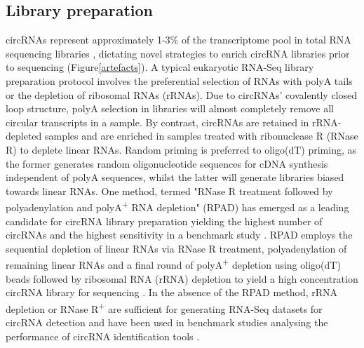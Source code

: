 \documentclass[journal,review,submit,pdftex,moreauthors]{Definitions/mdpi}
\begin{document}
\subsection{Library preparation}
circRNAs represent approximately 1-3\% of the transcriptome pool in total RNA sequencing libraries \cite{Guria2022May}, dictating novel strategies to enrich circRNA libraries prior to sequencing (Figure\ref{artefacts}). A typical eukaryotic RNA-Seq library preparation protocol involves the preferential selection of RNAs with polyA tails or the depletion of ribosomal RNAs (rRNAs). Due to circRNAs' covalently closed loop structure, polyA selection in libraries will almost completely remove all circular transcripts in a sample. By contrast, circRNAs are retained in rRNA-depleted samples and are enriched in samples treated with ribonuclease R (RNase R) to deplete linear RNAs. Random priming is preferred to oligo(dT) priming, as the former generates random oligonucleotide sequences for cDNA synthesis independent of polyA sequences, whilst the latter will generate libraries biased towards linear RNAs. One method, termed "RNase R treatment followed by polyadenylation and polyA\textsuperscript{+} RNA depletion" (RPAD) has emerged as a leading candidate for circRNA library preparation yielding the highest number of circRNAs and the highest sensitivity in a benchmark study \cite{Shi2022Dec}. RPAD employs the sequential depletion of linear RNAs via RNase R treatment, polyadenylation of remaining linear RNAs and a final round of polyA\textsuperscript{+} depletion using oligo(dT) beads followed by ribosomal RNA (rRNA) depletion to yield a high concentration circRNA library for sequencing \cite{Panda2017Jul, Pandey2019Feb}. In the absence of the RPAD method, rRNA depletion or RNase R\textsuperscript{+} are sufficient for generating RNA-Seq datasets for circRNA detection and have been used in benchmark studies analysing the performance of circRNA identification tools \cite{DCC}.
\end{document}

